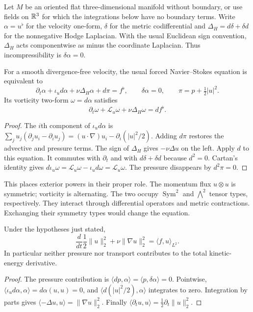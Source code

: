 Let $M$ be an oriented flat three-dimensional manifold without boundary, or use fields on $\mathbb{R}^3$ for which the integrations below have no boundary terms. Write $\alpha=u^\flat$ for the velocity one-form, $\delta$ for the metric codifferential and $\Delta_H=d\delta+\delta d$ for the nonnegative Hodge Laplacian. With the usual Euclidean sign convention, $\Delta_H$ acts componentwise as minus the coordinate Laplacian. Thus incompressibility is $\delta\alpha=0$.

\begin{proposition}
\label{prop:fluid-forms}
For a smooth divergence-free velocity, the usual forced Navier--Stokes equation is equivalent to
\[
 \partial_t\alpha+\iota_u d\alpha+\nu\Delta_H\alpha+d\pi=f^\flat,
 \qquad \delta\alpha=0,\qquad \pi=p+\tfrac12|u|^2.
\]
Its vorticity two-form $\omega=d\alpha$ satisfies
\[
 \partial_t\omega+\mathcal L_u\omega+\nu\Delta_H\omega=df^\flat.
\]
\end{proposition}
\begin{proof}
The $i$th component of $\iota_u d\alpha$ is
$\sum_j u_j(\partial_j u_i-\partial_i u_j)
=(u\cdot\nabla)u_i-\partial_i(|u|^2/2)$.
Adding $d\pi$ restores the advective and pressure terms. The sign of $\Delta_H$ gives $-\nu\Delta u$ on the left. Apply $d$ to this equation. It commutes with $\partial_t$ and with $d\delta+\delta d$ because $d^2=0$. Cartan's identity gives
$d\iota_u\omega=\mathcal L_u\omega-\iota_u d\omega=\mathcal L_u\omega$.
The pressure disappears by $d^2\pi=0$.
\end{proof}

This places exterior powers in their proper role. The momentum flux $u\otimes u$ is symmetric; vorticity is alternating. The two occupy $\operatorname{Sym}^2$ and $\bigwedge^2$ tensor types, respectively. They interact through differential operators and metric contractions. Exchanging their symmetry types would change the equation.

\begin{proposition}
\label{prop:fluid-energy}
Under the hypotheses just stated,
\[
 \frac{d}{dt}\frac12\|u\|_2^2+\nu\|\nabla u\|_2^2
 =\langle f,u\rangle_{L^2}.
\]
In particular neither pressure nor transport contributes to the total kinetic-energy derivative.
\end{proposition}
\begin{proof}
The pressure contribution is $\langle d p,\alpha\rangle=\langle p,\delta\alpha\rangle=0$. Pointwise, $\langle\iota_u d\alpha,\alpha\rangle=d\alpha(u,u)=0$, and $\langle d(|u|^2/2),\alpha\rangle$ integrates to zero. Integration by parts gives $\langle-\Delta u,u\rangle=\|\nabla u\|_2^2$. Finally $\langle\partial_tu,u\rangle=\tfrac12\partial_t\|u\|_2^2$.
\end{proof}

